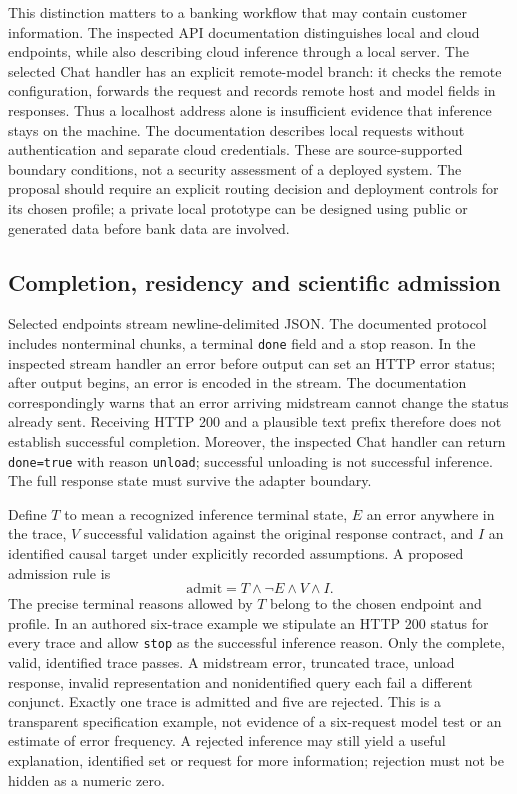 This distinction matters to a banking workflow that may contain customer information.
The inspected API documentation distinguishes local and cloud endpoints, while also describing
cloud inference through a local server. The selected Chat handler has an explicit remote-model
branch: it checks the remote configuration, forwards the request and records remote host and
model fields in responses. Thus a localhost address alone is insufficient evidence that inference
stays on the machine. The documentation describes local requests without authentication and
separate cloud credentials. These are source-supported boundary conditions, not a security
assessment of a deployed system. The proposal should require an explicit routing decision and
deployment controls for its chosen profile; a private local prototype can be designed using
public or generated data before bank data are involved.~\citep{exec28_bp_ollama}

\subsection{Completion, residency and scientific admission}
Selected endpoints stream newline-delimited JSON. The documented protocol includes nonterminal
chunks, a terminal \texttt{done} field and a stop reason. In the inspected stream handler an error
before output can set an HTTP error status; after output begins, an error is encoded in the
stream. The documentation correspondingly warns that an error arriving midstream cannot change
the status already sent. Receiving HTTP 200 and a plausible text prefix therefore does not
establish successful completion. Moreover, the inspected Chat handler can return
\texttt{done=true} with reason \texttt{unload}; successful unloading is not successful inference.
The full response state must survive the adapter boundary.~\citep{exec28_bp_ollama}

Define $T$ to mean a recognized inference terminal state, $E$ an error anywhere in the trace,
$V$ successful validation against the original response contract, and $I$ an identified causal
target under explicitly recorded assumptions. A proposed admission rule is
\[
 \mathrm{admit}=T\land\neg E\land V\land I.
\]
The precise terminal reasons allowed by $T$ belong to the chosen endpoint and profile.
In an authored six-trace example we stipulate an HTTP 200 status for every trace and allow
\texttt{stop} as the successful inference reason. Only the complete, valid, identified trace
passes. A midstream error, truncated trace, unload response, invalid representation and
nonidentified query each fail a different conjunct. Exactly one trace is admitted and five are
rejected. This is a transparent specification example, not evidence of a six-request model test
or an estimate of error frequency. A rejected inference may still yield a useful explanation,
identified set or request for more information; rejection must not be hidden as a numeric zero.
\citep{exec28_bp_reference}

